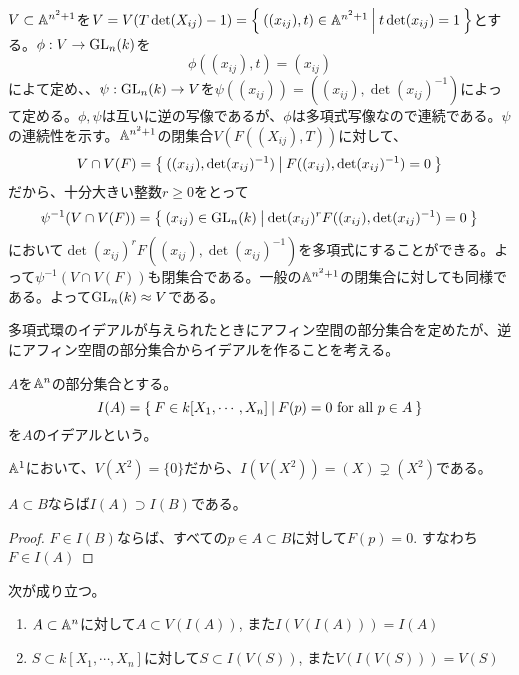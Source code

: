 \documentclass{ltjsreport}
\begin{document}
\begin{eg}\label{affine_gl_n}
  $V\subset\mathbb{A}^{n^2+1}$を$V=V(T\det(X_{ij})-1)=\left\{\:((x_{ij}),t)\in\mathbb{A}^{n^2+1}\:\middle|\:t\det(x_{ij})=1\:\right\}$とする。$\phi:V\rightarrow \text{GL}_n(k)$を
  \[
  \phi((x_{ij}),t)=(x_{ij})  
  \]
  によて定め、、$\psi:\text{GL}_n(k)\rightarrow V$を$\psi((x_{ij}))=((x_{ij}),\det(x_{ij})^{-1})$によって定める。$\phi,\psi$は互いに逆の写像であるが、$\phi$は多項式写像なので連続である。$\psi$の連続性を示す。$\mathbb{A}^{n^2+1}$の閉集合$V(F((X_{ij}),T))$に対して、
  \[
  V\cap V(F)=\left\{\:((x_{ij}),\det(x_{ij})^{-1})\:\middle|\:F((x_{ij}),\det(x_{ij})^{-1})=0\:\right\}  
  \]
  だから、十分大きい整数$r\geq 0$をとって
  \[
  \psi^{-1}(V\cap V(F))=\left\{\:(x_{ij})\in\text{GL}_n(k)\:\middle|\:\det(x_{ij})^rF((x_{ij}),\det(x_{ij})^{-1})=0\:\right\}  
  \]
  において$\det(x_{ij})^rF((x_{ij}),\det(x_{ij})^{-1})$を多項式にすることができる。よって$\psi^{-1}(V\cap V(F))$も閉集合である。一般の$\mathbb{A}^{n^2+1}$の閉集合に対しても同様である。よって$\text{GL}_n(k)\approx V$である。
\end{eg}




多項式環のイデアルが与えられたときにアフィン空間の部分集合を定めたが、逆にアフィン空間の部分集合からイデアルを作ることを考える。

\begin{defin}
  $A$を$\mathbb{A}^n$の部分集合とする。
  \[
  I(A)=\left\{\:F\in k[X_1,\cdots,X_n]\:\middle|\:F(p)=0 \text{ for all }p\in A\:\right\}
  \]
  を$A$のイデアルという。
\end{defin}

\begin{eg}
  $\mathbb{A}^1$において、$V(X^2)=\{0\}$だから、$I(V(X^2))=(X)\supsetneq (X^2)$である。
\end{eg}

\begin{prop}\label{containment2}
  $A\subset B$ならば$I(A)\supset I(B)$である。
\end{prop}

\begin{proof}
  $F\in I(B)$ならば、すべての$p\in A\subset B$に対して$F(p)=0$. すなわち$F\in I(A)$
\end{proof}

\begin{prop}\label{VIrelation}
  次が成り立つ。
  \begin{enumerate}
    \item $A\subset \mathbb{A}^n$に対して$A\subset V(I(A))$, また$I(V(I(A)))=I(A)$
    \item $S\subset k[X_1,\cdots,X_n]$に対して$S\subset I(V(S))$, また$V(I(V(S)))=V(S)$
  \end{enumerate}
\end{prop}
\end{document}

